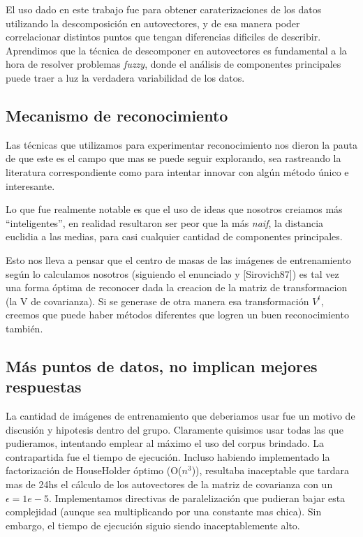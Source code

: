 El uso dado en este trabajo fue para obtener caraterizaciones de los datos utilizando la
descomposici\'on en autovectores, y de esa manera poder correlacionar distintos puntos que
tengan diferencias dificiles de describir. Aprendimos que la t\'ecnica de descomponer en autovectores
es fundamental a la hora de resolver problemas \textit{fuzzy}, donde
el an\'alisis de componentes principales puede traer a luz la verdadera variabilidad de los datos.


\subsection{Mecanismo de reconocimiento}

Las t\'ecnicas que utilizamos para experimentar reconocimiento nos dieron
la pauta de que este es el campo que mas se puede seguir explorando, sea rastreando la literatura
correspondiente como para intentar innovar con alg\'un m\'etodo \'unico e interesante.

Lo que fue realmente notable es que el uso de ideas que nosotros creiamos m\'as ``inteligentes'',
en realidad resultaron ser peor que la m\'as \textit{naif}, la distancia euclidia a las medias, para
casi cualquier cantidad de componentes principales.

Esto nos lleva a pensar que el centro de masas de las im\'agenes de entrenamiento seg\'un lo calculamos
nosotros (siguiendo el enunciado y [Sirovich87]) es tal vez una forma \'optima de reconocer
dada la creacion de la matriz de transformacion (la V de covarianza). Si se generase de otra manera esa
transformaci\'on $V^t$, creemos que puede haber m\'etodos diferentes que logren un buen reconocimiento tambi\'en.


\subsection{M\'as puntos de datos, no implican mejores respuestas}

La cantidad de im\'agenes de entrenamiento que deberiamos usar fue un motivo de discusi\'on y hipotesis
dentro del grupo. Claramente quisimos usar todas las que pudieramos, intentando emplear al m\'aximo el
uso del corpus brindado. La contrapartida fue el tiempo de ejecuci\'on. Incluso habiendo implementado
la factorizaci\'on de HouseHolder \'optimo (O($n^3$)), resultaba inaceptable que tardara mas de 24hs
el c\'alculo de los autovectores de la matriz de covarianza con un $\epsilon = 1e-5$. Implementamos
directivas de paralelizaci\'on que pudieran bajar esta complejidad (aunque sea multiplicando por una
constante mas chica). Sin embargo, el tiempo de ejecuci\'on siguio siendo inaceptablemente alto.

